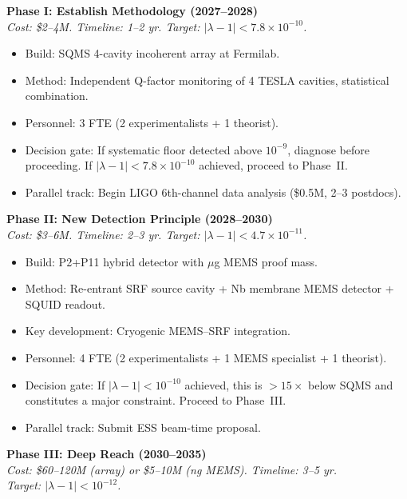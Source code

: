 \documentclass[11pt]{article}
\theoremstyle{definition}
\theoremstyle{remark}
\newcommand{\ee}[1]{\times 10^{#1}}
\newcommand{\lamdiff}{|\lambda-1|}
\begin{document}
\begin{tcolorbox}[colback=blue!5!white, colframe=blue!60!black,
  title=\textbf{DEFINITIVE DFD DETECTION ROADMAP}]

\textbf{Phase I: Establish Methodology (2027--2028)}\\
\textit{Cost: \$2--4M. Timeline: 1--2 yr. Target: $\lamdiff < 7.8\ee{-10}$.}
\begin{itemize}[nosep]
\item Build: SQMS 4-cavity incoherent array at Fermilab.
\item Method: Independent Q-factor monitoring of 4 TESLA cavities,
  statistical combination.
\item Personnel: 3 FTE (2 experimentalists + 1 theorist).
\item Decision gate: If systematic floor detected above $10^{-9}$,
  diagnose before proceeding. If $\lamdiff < 7.8\ee{-10}$ achieved,
  proceed to Phase~II.
\item Parallel track: Begin LIGO 6th-channel data analysis (\$0.5M,
  2--3 postdocs).
\end{itemize}

\textbf{Phase II: New Detection Principle (2028--2030)}\\
\textit{Cost: \$3--6M. Timeline: 2--3 yr. Target: $\lamdiff < 4.7\ee{-11}$.}
\begin{itemize}[nosep]
\item Build: P2+P11 hybrid detector with $\mu$g MEMS proof mass.
\item Method: Re-entrant SRF source cavity + Nb membrane MEMS detector +
  SQUID readout.
\item Key development: Cryogenic MEMS--SRF integration.
\item Personnel: 4 FTE (2 experimentalists + 1 MEMS specialist +
  1 theorist).
\item Decision gate: If $\lamdiff < 10^{-10}$ achieved, this is
  $>15\times$ below SQMS and constitutes a major constraint. Proceed
  to Phase~III.
\item Parallel track: Submit ESS beam-time proposal.
\end{itemize}

\textbf{Phase III: Deep Reach (2030--2035)}\\
\textit{Cost: \$60--120M (array) or \$5--10M (ng MEMS). Timeline: 3--5 yr.}\\
\textit{Target: $\lamdiff < 10^{-12}$.}


\end{tcolorbox}
\end{document}
